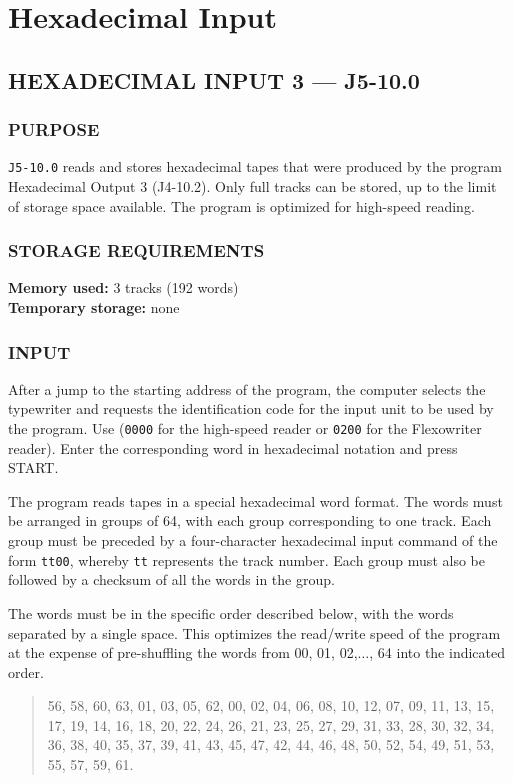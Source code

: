 \section{Hexadecimal Input}
\subsection*{HEXADECIMAL INPUT 3 --- J5-10.0}

\subsubsection*{PURPOSE}
\texttt{J5-10.0} reads and stores hexadecimal tapes that were produced by the program Hexadecimal Output 3 (J4-10.2). Only full tracks can be stored, up to the limit of storage space available. The program is optimized for high-speed reading.

\subsubsection*{STORAGE REQUIREMENTS}
\textbf{Memory used:} 3 tracks (192 words) \\
\textbf{Temporary storage:} none

\subsubsection*{INPUT}
After a jump to the starting address of the program, the computer selects the typewriter and requests the identification code for the input unit to be used by the program. Use (\texttt{0000} for the high-speed reader or \texttt{0200} for the Flexowriter reader). Enter the corresponding word in hexadecimal notation and press \textsf{START}.

The program reads tapes in a special hexadecimal word format. The words must be arranged in groups of 64, with each group corresponding to one track. Each group must be preceded by a four-character hexadecimal input command of the form \texttt{tt00}, whereby \texttt{tt} represents the track number. Each group must also be followed by a checksum of all the words in the group.

The words must be in the specific order described below, with the words separated by a single space. This optimizes the read/write speed of the program at the expense of pre-shuffling the words from 00, 01, 02,$\dots$, 64 into the indicated order.
\begin{quote}
56, 58, 60, 63, 01, 03, 05, 62, 00, 02, 04, 06, 08, 10, 12, 07, 09, 11, 13, 15, 17, 19, 14, 16, 18, 20, 22, 24, 26, 21, 23, 25, 27, 29, 31, 33, 28, 30, 32, 34, 36, 38, 40, 35, 37, 39, 41, 43, 45, 47, 42, 44, 46, 48, 50, 52, 54, 49, 51, 53, 55, 57, 59, 61.
\end{quote}

